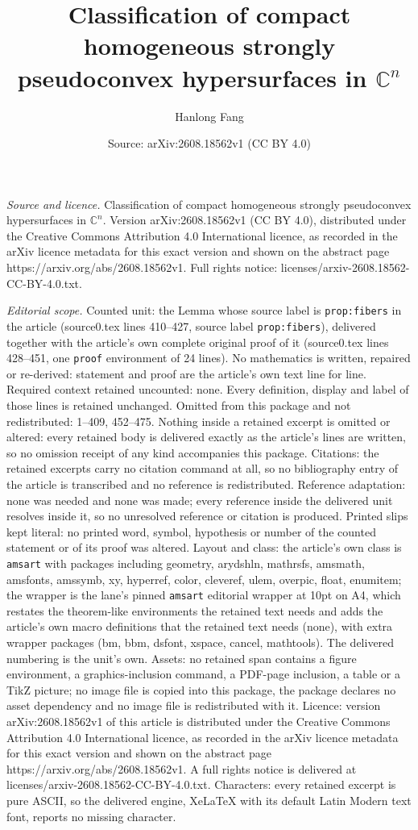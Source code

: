 \documentclass[10pt,a4paper]{amsart}
\title[Classification of compact homogeneous strongly pseudoconvex ]{Classification of compact homogeneous strongly pseudoconvex hypersurfaces in $\mathbb C^n$}
\author{Hanlong Fang}
\date{Source: arXiv:2608.18562v1 (CC BY 4.0)}
\begin{document}
\maketitle

\noindent\emph{Source and licence.} Classification of compact homogeneous strongly pseudoconvex hypersurfaces in $\mathbb C^n$. Version arXiv:2608.18562v1 (CC BY 4.0), distributed under the Creative Commons Attribution 4.0 International licence, as recorded in the arXiv licence metadata for this exact version and shown on the abstract page https://arxiv.org/abs/2608.18562v1. Full rights notice: licenses/arxiv-2608.18562-CC-BY-4.0.txt.\par\smallskip

\noindent\textit{Editorial scope.} Counted unit: the Lemma whose source label is \texttt{prop:fibers} in the article (source0.tex lines 410--427, source label \texttt{prop:fibers}), delivered together with the article's own complete original proof of it (source0.tex lines 428--451, one \texttt{proof} environment of 24 lines). No mathematics is written, repaired or re-derived: statement and proof are the article's own text line for line. Required context retained uncounted: none. Every definition, display and label of those lines is retained unchanged. Omitted from this package and not redistributed: 1--409, 452--475. Nothing inside a retained excerpt is omitted or altered: every retained body is delivered exactly as the article's lines are written, so no omission receipt of any kind accompanies this package. Citations: the retained excerpts carry no citation command at all, so no bibliography entry of the article is transcribed and no reference is redistributed. Reference adaptation: none was needed and none was made; every reference inside the delivered unit resolves inside it, so no unresolved reference or citation is produced. Printed slips kept literal: no printed word, symbol, hypothesis or number of the counted statement or of its proof was altered. Layout and class: the article's own class is \texttt{amsart} with packages including geometry, arydshln, mathrsfs, amsmath, amsfonts, amssymb, xy, hyperref, color, cleveref, ulem, overpic, float, enumitem; the wrapper is the lane's pinned \texttt{amsart} editorial wrapper at 10pt on A4, which restates the theorem-like environments the retained text needs and adds the article's own macro definitions that the retained text needs (none), with extra wrapper packages (bm, bbm, dsfont, xspace, cancel, mathtools). The delivered numbering is the unit's own. Assets: no retained span contains a figure environment, a graphics-inclusion command, a PDF-page inclusion, a table or a TikZ picture; no image file is copied into this package, the package declares no asset dependency and no image file is redistributed with it. Licence: version arXiv:2608.18562v1 of this article is distributed under the Creative Commons Attribution 4.0 International licence, as recorded in the arXiv licence metadata for this exact version and shown on the abstract page https://arxiv.org/abs/2608.18562v1. A full rights notice is delivered at licenses/arxiv-2608.18562-CC-BY-4.0.txt. Characters: every retained excerpt is pure ASCII, so the delivered engine, XeLaTeX with its default Latin Modern text font, reports no missing character.
\end{document}
